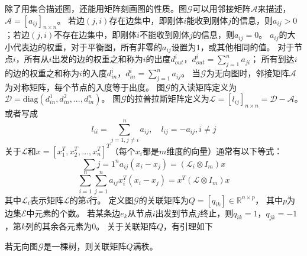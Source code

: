 除了用集合描述图，还能用矩阵刻画图的性质。图$\mathcal{G}$可以用邻接矩阵$\mathcal{A}$来描述，$\mathcal{A}=[a_{ij}]_{n\times n}$。
若边$(j,i)$存在边集中，即刚体$i$能收到刚体$j$的信息，则$a_{ij}>0$；若边$(j,i)$不存在边集中，即刚体$i$不能收到刚体$j$的信息，则$a_{ij}=0$。
$a_{ij}$的大小代表边的权重，对于平衡图，所有非零的$a_{ij}$设置为$1$，或其他相同的值。
对于节点$i$，所有从$i$出发的边的权重之和称为$i$的出度$d^i_{out}$，$d^i_{out}=\sum_{j=1}^na_{ji}$；
所有到达$i$的边的权重之和称为$i$的入度$d_{in}^i$，$d_{in}^i=\sum_{j=1}^na_{ij}$。
当$\mathcal{G}$为无向图时，邻接矩阵$\mathcal{A}$为对称矩阵，每个节点的入度等于出度。
图$\mathcal{G}$的入读矩阵定义为$\mathcal{D}=\text{diag}(d_{in}^1,d_{in}^2,...,d_{in}^n)$。
图$\mathcal{G}$的拉普拉斯矩阵定义为$\mathcal{L}=[l_{ij}]_{n\times n}=\mathcal{D}-\mathcal{A}$。或者写成
\begin{equation}
    l_{ii}=\sum_{j=1,j\not=i}^n a_{ij},\quad l_{ij}=-a_{ij},i\not=j
\end{equation}
关于$\mathcal{L}$和$x=[x_1^T,x_2^T,...,x_n^T]^T$（每个$x_i$都是$m$维度的向量）通常有以下等式：
\begin{equation}
    \sum{j=1}^na_{ij}(x_i-x_j)=(\mathcal{L}_i\otimes I_m)x
\end{equation}
\begin{equation}
    \sum_{i=1}^n\sum_{j=1}^na_{ij}x_i^T(x_i-x_j)=x^T(\mathcal{L}\otimes I_m)x
\end{equation}
其中$\mathcal{L}_i$表示矩阵$\mathcal{L}$的第$i$行。
定义图$\mathcal{G}$的关联矩阵为$Q=[q_{ik}]\in\mathbb{R}^{n\times p}$，
其中$p$为边集$\mathcal{E}$中元素的个数。
若某条边$e_k$从节点$i$出发到节点$j$终止，则$q_{ik}=1$，$q_{jk}=-1$，第$k$列的其余各元素为0。
关于关联矩阵$Q$，有引理如下
\begin{lemma}
    \label{lm:incidence}
    若无向图$\mathcal{G}$是一棵树，则关联矩阵$Q$满秩。
\end{lemma}
